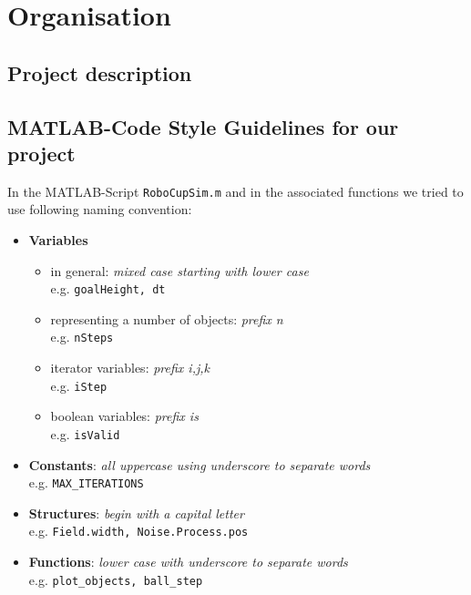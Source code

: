 
\appendix               	%
\chapter{Organisation} 
\section{Project description} \label{PrjDescription} 
%

\section{MATLAB-Code Style Guidelines for our project}
In the MATLAB-Script \texttt{RoboCupSim.m} and in the associated functions we tried to use following naming convention:
\begin{itemize}
	\item \textbf{Variables}
		\begin{itemize}
			\item in general: \emph{mixed case starting with lower case}\\
				e.g. \texttt{goalHeight, dt}
			\item representing a number of objects: \emph{prefix n}\\
				e.g. \texttt{nSteps}
			\item iterator variables: \emph{prefix i,j,k}\\
				e.g. \texttt{iStep}
			\item boolean variables: \emph{prefix is}\\
				e.g. \texttt{isValid}
		\end{itemize}
	
	\item \textbf{Constants}: \emph{all uppercase using underscore to separate words}\\
		e.g. \texttt{MAX\_ITERATIONS}
	
	\item \textbf{Structures}: \emph{begin with a capital letter}\\
		e.g. \texttt{Field.width, Noise.Process.pos}
	
	\item \textbf{Functions}: \emph{lower case with underscore to separate words}\\
		e.g. \texttt{plot\_objects, ball\_step}
\end{itemize}


